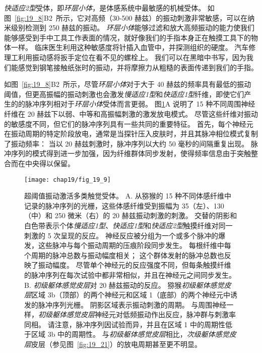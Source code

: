 \textit{快适应2型}受体，即\textit{环层小体}，是体感系统中最敏感的机械受体。
如图~\ref{fig:19_8}B2~所示，它对高频（30-500 赫兹）的振动刺激非常敏感，可以在纳米级别检测到 250 赫兹的振动。
\textit{环层小体}能够过滤和放大高频振动的能力使我们能够感受到手中工具工作表面的情况，就好像我们的手指本身正在触摸工具下的物体一样。
临床医生利用这种敏感度将针插入血管中，并探测组织的硬度。
汽车修理工利用振动感将扳手定位在看不见的螺栓上。
我们可以在黑暗中书写，因为我们能感觉到钢笔接触纸张时的振动，并将摩擦力从粗糙的表面传递到我们的手指。


如图~\ref{fig:19_8}B2~所示，尽管\textit{环层小体}对于大于 40 赫兹的频率具有最低的振动阈值，但更高振幅的振动刺激也会激发\textit{慢适应1型}和\textit{快适应1型}纤维，即使它们产生的的脉冲序列相对于\textit{环层小体}受体而言更弱。
图\ref{fig:19_9}A 说明了 15 种不同周围神经纤维在 20 赫兹下以弱、中等和高振幅刺激的激发放电模式。
尽管这些纤维对振动的敏感度不同，但它们的脉冲序列具有一些共同的重要特征。
首先，每个神经元在振动周期的特定阶段放电，通常是当探针压入皮肤时，并且其脉冲相位模式复制了振动频率：
当以 20 赫兹刺激时，脉冲序列以大约 50 毫秒的间隔重复出现。
脉冲序列的模式得到进一步加强，因为纤维群体同步发射，使得频率信息由于突触整合而在中央得以保留。


\begin{figure}[htbp]
	\centering
	\texttt{[image: chap19/fig\_19\_9]}
	\caption{超阈值振动激活多类触觉受体。 
		A. 从猕猴的 15 种不同体感纤维中记录的脉冲序列的光栅，这些体感纤维受到振幅为 35（左）、130（中）和 250 微米（右）的 20 赫兹振动刺激的刺激。
		交替的阴影和白色带表示个体\textit{慢适应1型}、\textit{快适应1型}和\textit{快适应2型}触摸纤维对同一刺激的 5 次呈现的反应。
		神经反应被分组为一个或多个脉冲的爆发，这些脉冲与每个振动周期的压痕阶段同步发生。
		每根纤维中每个周期的脉冲总数与振动幅度相关； 这个群体发射的脉冲总数也反映了振动幅度。
		尽管单个神经元的反应强度不同，但每条触摸纤维的脉冲序列在每次试验中都非常相似，并且在神经元之间同步发生\cite{muniak2007neural}。
		B. \textit{初级躯体感觉皮层}对 20 赫兹振动的反应。
		猕猴\textit{初级躯体感觉皮层}区域 3b（顶部）的两个神经元和区域 1（底部）的两个神经元中诱发的脉冲序列光栅。
		阴影区域表示振动刺激的周期。
		与周围神经一样，\textit{初级躯体感觉皮层}神经元对低频振动作出反应，脉冲群与刺激率同相。
		请注意，脉冲序列因试验而异，并且在区域 1 中的周期性低于区域 3b 中的周期性。
		与\textit{初级躯体感觉皮层}相比，\textit{次级躯体感觉皮层}皮层（参见图~\ref{fig:19_21}）的放电周期甚至更不明显\cite{salinas2000periodicity}。}
	\label{fig:19_9}
\end{figure}


